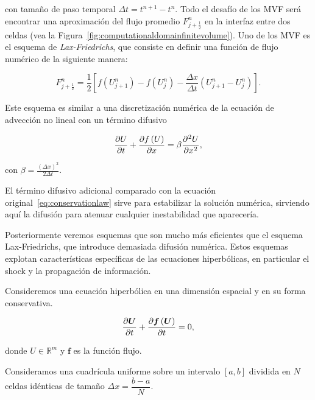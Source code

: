con tamaño de paso temporal $\Delta t=t^{n+1}-t^{n}$.
Todo el desafío de los MVF será encontrar una aproximación del flujo
promedio
\begin{math}
	F^{n}_{j+\frac{1}{2}}
\end{math}
en la interfaz entre dos celdas (vea la
Figura~\ref{fig:computationaldomainfinitevolume}).
Uno de los MVF es el esquema de \emph{Lax-Friedrichs}, que consiste
en definir una función de flujo numérico de la siguiente manera:

\begin{equation*}
	F^{n}_{j+\frac{1}{2}}=
	\frac{1}{2}
	\left[
		f\left(U^{n}_{j+1}\right)-
		f\left(U^{n}_{j}\right)-
		\frac{\Delta x}{\Delta t}
		\left(
		U^{n}_{j+1}-
		U^{n}_{j}
		\right)
		\right].
\end{equation*}

Este esquema es similar a una discretización numérica de la ecuación
de advección no lineal con un término difusivo

\begin{equation*}
	\diffp{U}{t}+
	\diffp{f\left(U\right)}{x}=
	\beta
	\diffp[2]{U}{x},
\end{equation*}

con
\begin{math}
	\beta=
	\frac{{\left(\Delta x\right)}^{2}}{2\Delta t}
\end{math}.

El término difusivo adicional comparado con la ecuación
original~\eqref{eq:conservationlaw} sirve para estabilizar la
solución numérica, sirviendo aquí la difusión para atenuar cualquier
inestabilidad que aparecería.

Posteriormente veremos esquemas que son mucho más eficientes que el
esquema Lax-Friedrichs, que introduce demasiada difusión numérica.
Estos esquemas explotan características específicas de las ecuaciones
hiperbólicas, en particular el shock y la propagación de información.

Consideremos una ecuación hiperbólica en una dimensión espacial y en
su forma conservativa.

\begin{equation}\label{eq:hyperbolic1d}
	\diffp{\bm{U}}{t}+
	\diffp{\bm{f}\left(\bm{U}\right)}{t}=
	0,
\end{equation}

donde $U\in\mathbb{R}^{m}$ y $\bm{f}$ es la función flujo.

Consideramos una cuadrícula uniforme sobre un intervalo
$\left[a,b\right]$ dividida en $N$ celdas idénticas de tamaño
\begin{math}
	\Delta x=
	\dfrac{b-a}{N}
\end{math}.

